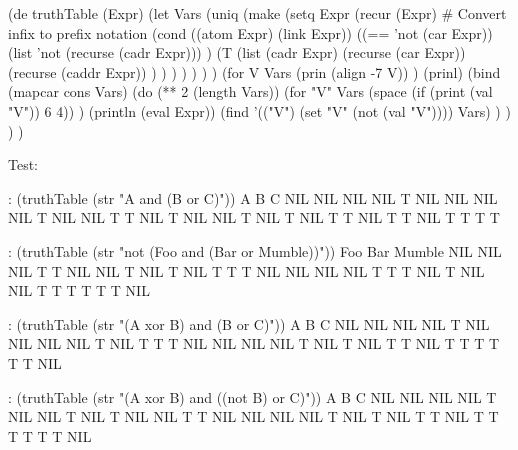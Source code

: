 \begin{wideverbatim}

(de truthTable (Expr)
   (let Vars
      (uniq
         (make
            (setq Expr
               (recur (Expr)  # Convert infix to prefix notation
                  (cond
                     ((atom Expr) (link Expr))
                     ((== 'not (car Expr))
                        (list 'not (recurse (cadr Expr))) )
                     (T
                        (list
                           (cadr Expr)
                           (recurse (car Expr))
                           (recurse (caddr Expr)) ) ) ) ) ) ) )
      (for V Vars
         (prin (align -7 V)) )
      (prinl)
      (bind (mapcar cons Vars)
         (do (** 2 (length Vars))
            (for "V" Vars
               (space (if (print (val "V")) 6 4)) )
            (println (eval Expr))
            (find '(("V") (set "V" (not (val "V")))) Vars) ) ) ) )


\end{wideverbatim}

\begin{wideverbatim}


Test:

: (truthTable (str "A and (B or C)"))
A      B      C
NIL    NIL    NIL    NIL
T      NIL    NIL    NIL
NIL    T      NIL    NIL
T      T      NIL    T
NIL    NIL    T      NIL
T      NIL    T      T
NIL    T      T      NIL
T      T      T      T

: (truthTable (str "not (Foo and (Bar or Mumble))"))
Foo    Bar    Mumble
NIL    NIL    NIL    T
T      NIL    NIL    T
NIL    T      NIL    T
T      T      NIL    NIL
NIL    NIL    T      T
T      NIL    T      NIL
NIL    T      T      T
T      T      T      NIL

: (truthTable (str "(A xor B) and (B or C)"))
A      B      C
NIL    NIL    NIL    NIL
T      NIL    NIL    NIL
NIL    T      NIL    T
T      T      NIL    NIL
NIL    NIL    T      NIL
T      NIL    T      T
NIL    T      T      T
T      T      T      NIL

: (truthTable (str "(A xor B) and ((not B) or C)"))
A      B      C
NIL    NIL    NIL    NIL
T      NIL    NIL    T
NIL    T      NIL    NIL
T      T      NIL    NIL
NIL    NIL    T      NIL
T      NIL    T      T
NIL    T      T      T
T      T      T      NIL

\end{wideverbatim}



% 
